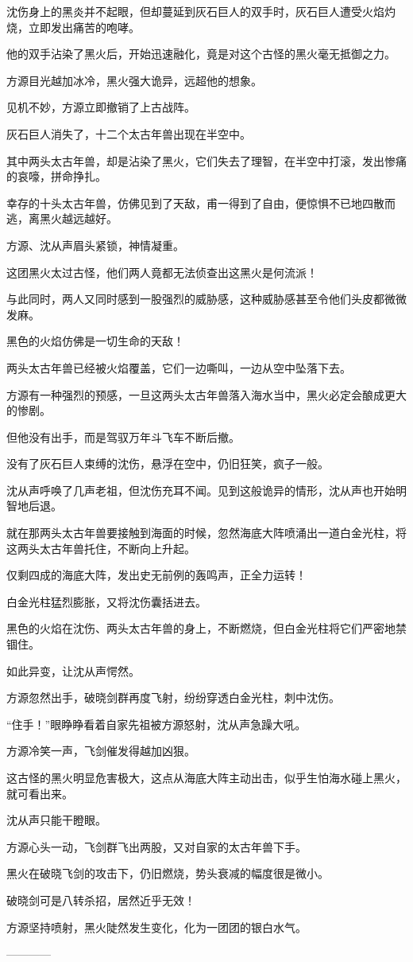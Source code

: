 \begin{this_body}
沈伤身上的黑炎并不起眼，但却蔓延到灰石巨人的双手时，灰石巨人遭受火焰灼烧，立即发出痛苦的咆哮。

他的双手沾染了黑火后，开始迅速融化，竟是对这个古怪的黑火毫无抵御之力。

方源目光越加冰冷，黑火强大诡异，远超他的想象。

见机不妙，方源立即撤销了上古战阵。

灰石巨人消失了，十二个太古年兽出现在半空中。

其中两头太古年兽，却是沾染了黑火，它们失去了理智，在半空中打滚，发出惨痛的哀嚎，拼命挣扎。

幸存的十头太古年兽，仿佛见到了天敌，甫一得到了自由，便惊惧不已地四散而逃，离黑火越远越好。

方源、沈从声眉头紧锁，神情凝重。

这团黑火太过古怪，他们两人竟都无法侦查出这黑火是何流派！

与此同时，两人又同时感到一股强烈的威胁感，这种威胁感甚至令他们头皮都微微发麻。

黑色的火焰仿佛是一切生命的天敌！

两头太古年兽已经被火焰覆盖，它们一边嘶叫，一边从空中坠落下去。

方源有一种强烈的预感，一旦这两头太古年兽落入海水当中，黑火必定会酿成更大的惨剧。

但他没有出手，而是驾驭万年斗飞车不断后撤。

没有了灰石巨人束缚的沈伤，悬浮在空中，仍旧狂笑，疯子一般。

沈从声呼唤了几声老祖，但沈伤充耳不闻。见到这般诡异的情形，沈从声也开始明智地后退。

就在那两头太古年兽要接触到海面的时候，忽然海底大阵喷涌出一道白金光柱，将这两头太古年兽托住，不断向上升起。

仅剩四成的海底大阵，发出史无前例的轰鸣声，正全力运转！

白金光柱猛烈膨胀，又将沈伤囊括进去。

黑色的火焰在沈伤、两头太古年兽的身上，不断燃烧，但白金光柱将它们严密地禁锢住。

如此异变，让沈从声愕然。

方源忽然出手，破晓剑群再度飞射，纷纷穿透白金光柱，刺中沈伤。

“住手！”眼睁睁看着自家先祖被方源怒射，沈从声急躁大吼。

方源冷笑一声，飞剑催发得越加凶狠。

这古怪的黑火明显危害极大，这点从海底大阵主动出击，似乎生怕海水碰上黑火，就可看出来。

沈从声只能干瞪眼。

方源心头一动，飞剑群飞出两股，又对自家的太古年兽下手。

黑火在破晓飞剑的攻击下，仍旧燃烧，势头衰减的幅度很是微小。

破晓剑可是八转杀招，居然近乎无效！

方源坚持喷射，黑火陡然发生变化，化为一团团的银白水气。

------------

\end{this_body}

